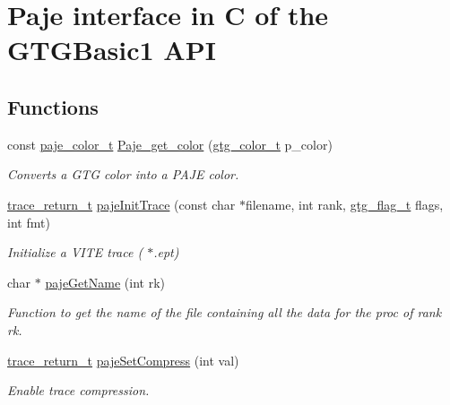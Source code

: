 \hypertarget{group__cpaje}{\section{Paje interface in C of the G\-T\-G\-Basic1 A\-P\-I}
\label{group__cpaje}
}
\subsection*{Functions}
\begin{DoxyCompactItemize}
\item 
const \hyperlink{GTGPaje_8h_a5aab6af34e98e257ef546c8fdc17ab94}{paje\-\_\-color\-\_\-t} \hyperlink{group__cpaje_ga91d2beb5b926254b7922f7c5fc6e2c1b}{Paje\-\_\-get\-\_\-color} (\hyperlink{GTGColor_8h_a7d118edf2d6e2588a0323079259fb0d6}{gtg\-\_\-color\-\_\-t} p\-\_\-color)
\begin{DoxyCompactList}\small\item\em Converts a G\-T\-G color into a P\-A\-J\-E color. \end{DoxyCompactList}\item 
\hyperlink{group__type_ga1f1b68fb37d7331f03a48ef0993a0788}{trace\-\_\-return\-\_\-t} \hyperlink{group__cpaje_ga32902ea7f94f1f890c016da04c2d06b6}{paje\-Init\-Trace} (const char $\ast$filename, int rank, \hyperlink{GTGBasic_8h_a7a5d407dd23dfced8b5937332ff80972}{gtg\-\_\-flag\-\_\-t} flags, int fmt)
\begin{DoxyCompactList}\small\item\em Initialize a V\-I\-T\-E trace ( $\ast$.ept) \end{DoxyCompactList}\item 
char $\ast$ \hyperlink{group__cpaje_ga7cd6968ffcd034c3dd67d48ef047934c}{paje\-Get\-Name} (int rk)
\begin{DoxyCompactList}\small\item\em Function to get the name of the file containing all the data for the proc of rank rk. \end{DoxyCompactList}\item 
\hyperlink{group__type_ga1f1b68fb37d7331f03a48ef0993a0788}{trace\-\_\-return\-\_\-t} \hyperlink{group__cpaje_ga92b9b4f5b8cd6656e6fce9b18720931f}{paje\-Set\-Compress} (int val)
\begin{DoxyCompactList}\small\item\em Enable trace compression. \end{DoxyCompactList}\item 

\end{DoxyCompactItemize}
